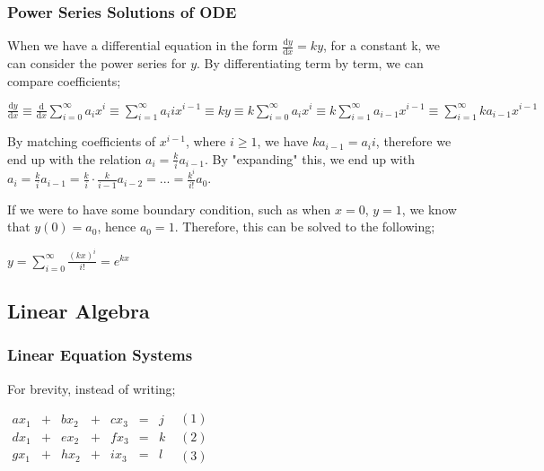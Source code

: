 \documentclass[a4paper, 12pt]{article}
\newcommand{\dif}[2]{\frac{\mathrm{d}#1}{\mathrm{d}#2}}
\newcommand{\summation}[3]{\sum\limits_{#1}^{#2} #3}
\begin{document}
            \subsubsection*{Power Series Solutions of ODE}
                When we have a differential equation in the form $\dif{y}{x} = ky$, for a constant k, we can consider the power series for $y$. By differentiating term by term, we can compare coefficients;
                \begin{center}
                    $\dif{y}{x} \equiv \dif{}{x}\summation{i = 0}{\infty}{a_ix^i} \equiv \summation{i = 1}{\infty}{a_iix^{i - 1}} \equiv ky \equiv k\summation{i = 0}{\infty}{a_ix^i} \equiv k\summation{i = 1}{\infty}{a_{i - 1}x^{i - 1}} \equiv \summation{i = 1}{\infty}{ka_{i - 1}x^{i - 1}}$
                \end{center}
                By matching coefficients of $x^{i - 1}$, where $i \geq 1$, we have $ka_{i - 1} = a_ii$, therefore we end up with the relation $a_i = \frac{k}{i}a_{i - 1}$. By "expanding" this, we end up with $a_i = \frac{k}{i}a_{i - 1} = \frac{k}{i} \cdot \frac{k}{i - 1}a_{i - 2} = ... = \frac{k^i}{i!}a_0$.
                \medskip

                If we were to have some boundary condition, such as when $x = 0$, $y = 1$, we know that $y(0) = a_0$, hence $a_0 = 1$. Therefore, this can be solved to the following;
                \begin{center}
                    $y = \summation{i = 0}{\infty}{\frac{(kx)^i}{i!}} = e^{kx}$
                \end{center}
        \subsection*{Linear Algebra}
            \subsubsection*{Linear Equation Systems}
                For brevity, instead of writing;
                \smallskip

                $\begin{matrix}
                    ax_1 & + & bx_2 & + & cx_3 & = & j \\
                    dx_1 & + & ex_2 & + & fx_3 & = & k \\
                    gx_1 & + & hx_2 & + & ix_3 & = & l
                \end{matrix}$ \hfill $\begin{matrix}
                    (1) \\
                    (2) \\
                    (3)
                \end{matrix}$
\end{document}
